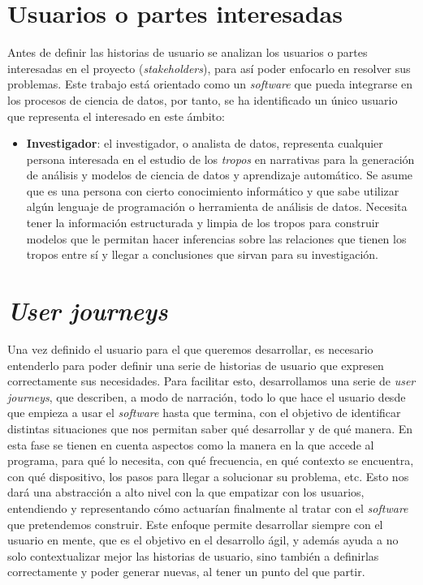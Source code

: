 \section{Usuarios o partes interesadas}
Antes de definir las historias de usuario se analizan los usuarios o partes
interesadas en el proyecto (\textit{stakeholders}), para así poder enfocarlo en
resolver sus problemas. Este trabajo está orientado como un \textit{software}
que pueda integrarse en los procesos de ciencia de datos, por tanto, se ha
identificado un único usuario que representa el interesado en este ámbito:
\begin{itemize}
    \item \textbf{Investigador}: el investigador, o analista de datos,
    representa cualquier persona interesada en el estudio de los \textit{tropos}
    en narrativas para la generación de análisis y modelos de ciencia de datos y
    aprendizaje automático. Se asume que es una persona con cierto conocimiento
    informático y que sabe utilizar algún lenguaje de programación o herramienta
    de análisis de datos. Necesita tener la información estructurada y limpia de
    los tropos para construir modelos que le permitan hacer inferencias sobre
    las relaciones que tienen los tropos entre sí y llegar a conclusiones que
    sirvan para su investigación.
\end{itemize}

\section{\textit{User journeys}} 

Una vez definido el usuario para el que queremos desarrollar, es necesario
entenderlo para poder definir una serie de historias de usuario que expresen
correctamente sus necesidades. Para facilitar esto, desarrollamos una serie de
\textit{user journeys}, que describen, a modo de narración, todo lo que hace el
usuario desde que empieza a usar el \textit{software} hasta que termina, con el
objetivo de identificar distintas situaciones que nos permitan saber qué
desarrollar y de qué manera. En esta fase se tienen en cuenta aspectos como la
manera en la que accede al programa, para qué lo necesita, con qué frecuencia,
en qué contexto se encuentra, con qué dispositivo, los pasos para llegar a
solucionar su problema, etc. Esto nos dará una abstracción a alto nivel con la
que empatizar con los usuarios, entendiendo y representando cómo actuarían
finalmente al tratar con el \textit{software} que pretendemos construir. Este
enfoque permite desarrollar siempre con el usuario en mente, que es el objetivo
en el desarrollo ágil, y además ayuda a no solo contextualizar mejor las
historias de usuario, sino también a definirlas correctamente y poder generar
nuevas, al tener un punto del que partir.

